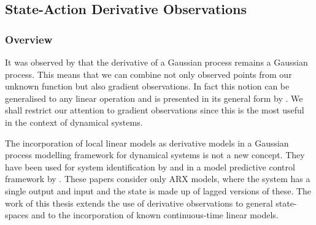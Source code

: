 \subsection{State-Action Derivative Observations}

\subsubsection{Overview}
It was observed by \cite{SMLL03} that the derivative of a Gaussian process remains a Gaussian process. This means that we can combine not only observed points from our unknown function but also gradient observations. In fact this notion can be generalised to any linear operation and is presented in its general form by \cite{Sar11}. We shall restrict our attention to gradient observations since this is the most useful in the context of dynamical systems.

The incorporation of local linear models as derivative models in a Gaussian process modelling framework for dynamical systems is not a new concept. They have been used for system identification by \cite{AK11} and in a model predictive control framework by \cite{AK08}. These papers consider only ARX models, where the system has a single output and input and the state is made up of lagged versions of these. The work of this thesis extends the use of derivative observations to general state-spaces and to the incorporation of known continuous-time linear models.

